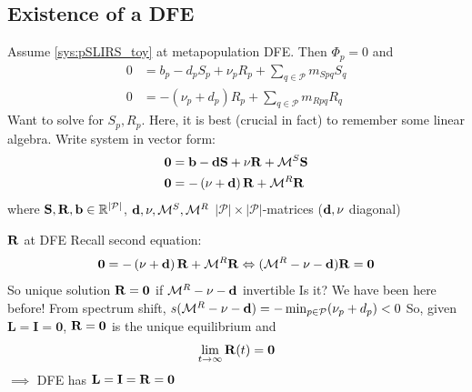\documentclass[aspectratio=43]{beamer}
\begin{document}
\subsection{Existence of a DFE}


\begin{frame}{}
Assume \eqref{sys:pSLIRS_toy} at metapopulation DFE. Then $\Phi_p=0$ and 
\begin{align*}
0 &=b_p-d_pS_p+\nu_pR_p
+\textstyle{\sum_{q\in\mathcal{P}}} m_{Spq}S_{q} \\
0 &=-\left(\nu_{p}+d_{p}\right)R_{p}
+\textstyle{\sum_{q\in\mathcal{P}}} m_{Rpq}R_{q}
\end{align*}
Want to solve for $S_p,R_p$. Here, it is best (crucial in fact) to remember some linear algebra. Write system in vector form:
\begin{align*}
\mathbf{0} &=\mathbf{b}-\mathbf{d}\mathbf{S}+\mathbf{\nu}\mathbf{R}+\mathcal{M}^S\mathbf{S} \\
\mathbf{0} &=-\left(\mathbf{\nu}+\mathbf{d}\right)\mathbf{R}+\mathcal{M}^R\mathbf{R}
\end{align*}
where $\mathbf{S},\mathbf{R},\mathbf{b}\in\mathbb{R}^{|\mathcal{P}|}$, $\mathbf{d},\mathbf{\nu},\mathcal{M}^S,\mathcal{M}^R$ $|\mathcal{P}|\times|\mathcal{P}|$-matrices ($\mathbf{d},\mathbf{\nu}$ diagonal)
\end{frame}

\begin{frame}{$\mathbf{R}$ at DFE}
Recall second equation:
$$
\mathbf{0} =-\left(\mathbf{\nu}+\mathbf{d}\right)\mathbf{R}+\mathcal{M}^R\mathbf{R} \Leftrightarrow (\mathcal{M}^R-\mathbf{\nu}-\mathbf{d})\mathbf{R}=\mathbf{0}
$$
\vfill
So unique solution $\mathbf{R}=\mathbf{0}$ if $\mathcal{M}^R-\mathbf{\nu}-\mathbf{d}$ invertible
Is it?
\vfill
We have been here before! 
\vfill
From spectrum shift, $s(\mathcal{M}^R-\mathbf{\nu}-\mathbf{d})=-\min_{p\in\mathcal{P}}(\nu_p+d_p)<0$
\vfill
So, given $\mathbf{L}=\mathbf{I}=\mathbf{0}$, $\mathbf{R}=\mathbf{0}$ is the unique equilibrium and
$$
\lim_{t\to\infty}\mathbf{R}(t)=\mathbf{0}
$$
\vfill
$\implies$ DFE has $\mathbf{L}=\mathbf{I}=\mathbf{R}=\mathbf{0}$
\end{frame}
\end{document}
